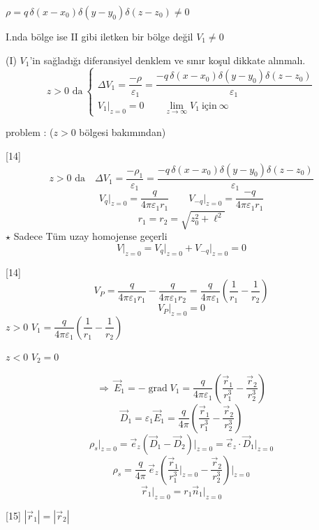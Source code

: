 \documentclass[11pt,a4paper]{article}
\begin{document}
$\rho=q\,\delta(x-x_0)\delta(y-y_0)\delta(z-z_0)\neq0$

I.nda bölge ise II gibi iletken bir bölge değil $V_1\neq0$

(I) $V_1$'in sağladığı diferansiyel denklem ve sınır koşul dikkate alınmalı.
\[
z>0\text{ da}\ \left\{\begin{array}{l}
\Delta V_1=\dfrac{-\rho}{\varepsilon_1}=\dfrac{-q\,\delta(x-x_0)\delta(y-y_0)\delta(z-z_0)}{\varepsilon_1}\\[1.5ex]
V_1\big|_{z=0}=0\qquad\lim\limits_{z\to\infty}V_1\ \text{için}\ \infty
\end{array}\right.
\]

\textcolor{turuncukalem}{ problem :} ($z>0$ bölgesi bakımından)

[14]
\[
z>0\text{ da}\quad\Delta V_1=\frac{-\rho_1}{\varepsilon_1}=\frac{-q\,\delta(x-x_0)\delta(y-y_0)\delta(z-z_0)}{\varepsilon_1}
\]
\[
V_q\Big|_{z=0}=\frac{q}{4\pi\varepsilon_1 r_1}\qquad V_{-q}\Big|_{z=0}=\frac{-q}{4\pi\varepsilon_1 r_1}
\]
\[
r_1=r_2=\sqrt{z_0^{2}+\ell^{2}}
\]
\textcolor{kirmizikalem}{$\star$ Sadece Tüm uzay homojense  geçerli}
\[
V\Big|_{z=0}=V_q\Big|_{z=0}+V_{-q}\Big|_{z=0}=0
\]

[14]
\[
V_P=\frac{q}{4\pi\varepsilon_1 r_1}-\frac{q}{4\pi\varepsilon_1 r_2}=\frac{q}{4\pi\varepsilon_1}\left(\frac{1}{r_1}-\frac{1}{r_2}\right)
\]
\[
V_P\Big|_{z=0}=0
\]
$z>0$ \quad $V_1=\dfrac{q}{4\pi\varepsilon_1}\left(\dfrac{1}{r_1}-\dfrac{1}{r_2}\right)$

$z<0$ \quad $V_2=0$

\[
\Rightarrow\ \vec E_1=-\operatorname{grad}V_1=\frac{q}{4\pi\varepsilon_1}\left(\frac{\vec r_1}{r_1^{3}}-\frac{\vec r_2}{r_2^{3}}\right)
\]
\[
\vec D_1=\varepsilon_1\vec E_1=\frac{q}{4\pi}\left(\frac{\vec r_1}{r_1^{3}}-\frac{\vec r_2}{r_2^{3}}\right)
\]
\[
\rho_s\Big|_{z=0}=\vec e_z\left(\vec D_1-\vec D_2\right)\Big|_{z=0}=\vec e_z\cdot\vec D_1\Big|_{z=0}
\]
\[
\rho_s=\frac{q}{4\pi}\,\vec e_z\left(\frac{\vec r_1}{r_1^{3}}\Big|_{z=0}-\frac{\vec r_2}{r_2^{3}}\right)\Big|_{z=0}
\]
\[
\vec r_1\Big|_{z=0}=r_1\vec n_1\Big|_{z=0}
\]

[15]
\textcolor{turuncukalem}{$|\vec r_1|=|\vec r_2|$}
\end{document}

